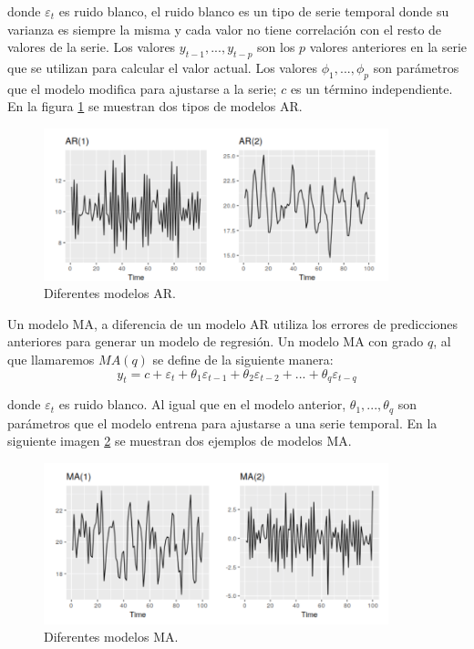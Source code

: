 \noindent donde $\varepsilon_t$ es ruido blanco, el ruido blanco es un tipo de serie temporal donde su varianza es siempre la misma y cada valor no tiene correlación con el resto de valores de la serie. Los valores $y_{t-1}, ..., y_{t-p}$ son los $p$ valores anteriores en la serie que se utilizan para calcular el valor actual. Los valores $\phi_1, ..., \phi_p$ son parámetros que el modelo modifica para ajustarse a la serie; $c$ es un término independiente. En la figura \ref{fig:211} se muestran dos tipos de modelos AR.\newline

\begin{figure}[H]
	\centering
	\includegraphics[width=100mm]{imagenes/autoregression_example.png}
	\caption{Diferentes modelos AR.}
	\label{fig:211}
\end{figure}
\verticalspace

Un modelo MA, a diferencia de un modelo AR utiliza los errores de predicciones anteriores para generar un modelo de regresión. Un modelo MA con grado $q$, al que llamaremos $MA(q)$ se define de la siguiente manera:
$$ y_t = c + \varepsilon_t + \theta_1 \varepsilon_{t-1} + \theta_2 \varepsilon_{t-2} + ... + \theta_q \varepsilon_{t-q}$$

\noindent donde $\varepsilon_t$ es ruido blanco. Al igual que en el modelo anterior, $\theta_1, ..., \theta_q$ son parámetros que el modelo entrena para ajustarse a una serie temporal. En la siguiente imagen \ref{fig:212} se muestran dos ejemplos de modelos MA.

\newpage

\begin{figure}[H]
	\centering
	\includegraphics[width=100mm]{imagenes/moving_averages_example.png}
	\caption{Diferentes modelos MA.}
	\label{fig:212}
\end{figure}

